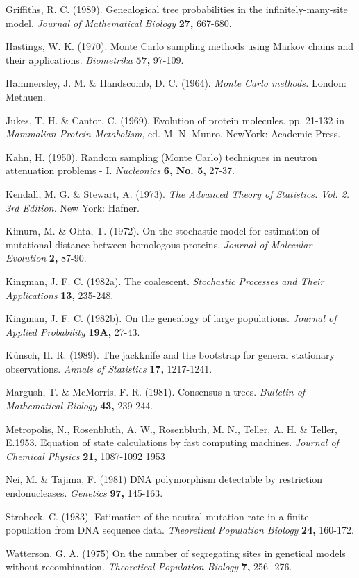 {Griffiths, R. C. (1989).  Genealogical tree probabilities in the
infinitely-many-site model.  {\it Journal of Mathematical Biology} {\bf 27,}
667-680.
\medskip

Hastings, W. K. (1970).  Monte Carlo sampling methods using Markov chains
and their applications.  {\it Biometrika} {\bf 57,} 97-109.
\medskip

Hammersley, J. M. \& Handscomb, D. C. (1964).  {\it Monte Carlo methods.}  London: Methuen.
\medskip

Jukes, T. H. \& Cantor, C. (1969).  Evolution of protein molecules. pp.
21-132 in {\it Mammalian Protein Metabolism}, ed. M. N. Munro. NewYork: Academic Press.
\medskip

Kahn, H. (1950). Random sampling (Monte Carlo) techniques in neutron
attenuation problems - I.  {\it Nucleonics} {\bf 6, No. 5,} 27-37.
\medskip

Kendall, M. G. \& Stewart, A. (1973).  {\it The Advanced Theory of Statistics.
Vol. 2. 3rd Edition.}  New York: Hafner.
\medskip

Kimura, M. \& Ohta, T.  (1972).  On the stochastic model for estimation of
mutational distance between homologous proteins.  {\it Journal of Molecular
Evolution} {\bf 2,} 87-90.
\medskip

Kingman, J. F. C. (1982a).  The coalescent.  {\it Stochastic Processes and Their
Applications}  {\bf 13,} 235-248.
\medskip

Kingman, J. F. C. (1982b).  On the genealogy of large populations.  {\it
Journal of Applied Probability}  {\bf 19A,} 27-43.
\medskip

K\"{u}nsch, H. R. (1989). The jackknife and the bootstrap for general
stationary observations.  {\it Annals of Statistics} {\bf 17,} 1217-1241.
\medskip

Margush, T. \& McMorris, F. R.  (1981).  Consensus n-trees.  {\it Bulletin of
Mathematical Biology} {\bf 43,} 239-244.
\medskip

Metropolis, N., Rosenbluth, A. W., Rosenbluth, M. N., Teller, A. H. \& Teller, E.1953.  Equation of state calculations by fast computing machines.
{\it Journal of Chemical Physics}  {\bf 21,} 1087-1092  1953
\medskip

Nei, M. \&  Tajima, F.  (1981)   DNA polymorphism detectable by
restriction endonucleases.  {\it Genetics} {\bf 97,} 145-163.
\medskip

Strobeck, C.  (1983).  Estimation of the neutral mutation rate in a finite
population from DNA sequence data.  {\it Theoretical Population Biology}
{\bf 24,}  160-172.
\medskip

Watterson, G. A.  (1975)  On the number of segregating sites in genetical
models without recombination.  {\it Theoretical Population Biology} {\bf 7,} 256
-276.
\medskip
}
  
